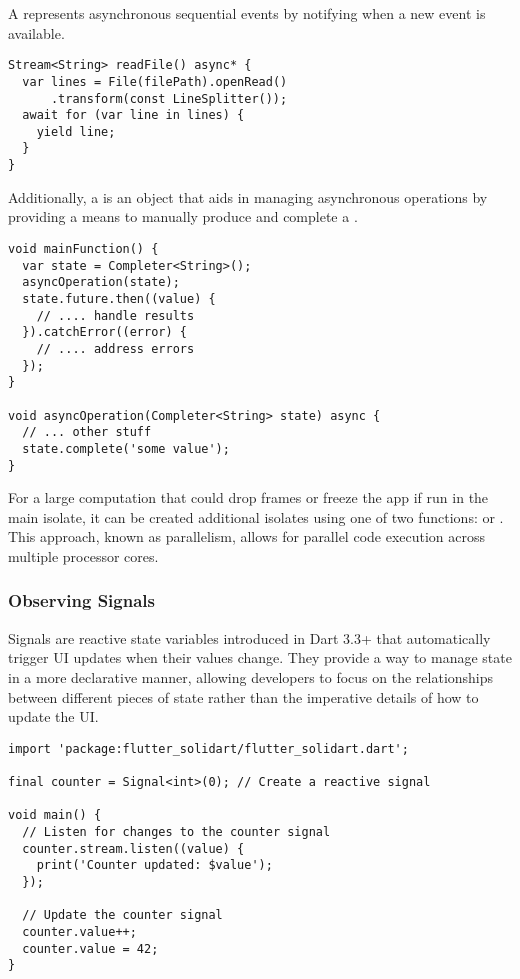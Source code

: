 \noindent A  represents asynchronous sequential events by notifying when a new event is available.

\begin{lstlisting}
Stream<String> readFile() async* {
  var lines = File(filePath).openRead()
      .transform(const LineSplitter());
  await for (var line in lines) {
    yield line;
  }
}
\end{lstlisting}

\noindent Additionally, a  is an object that aids in managing asynchronous operations by providing a means
to manually produce and complete a .

\begin{lstlisting}
void mainFunction() {
  var state = Completer<String>();
  asyncOperation(state);
  state.future.then((value) {
    // .... handle results
  }).catchError((error) {
    // .... address errors
  });
}

void asyncOperation(Completer<String> state) async {
  // ... other stuff
  state.complete('some value');
}
\end{lstlisting}

\noindent For a large computation that could drop frames or freeze the app if run in the main isolate, it can be
created additional isolates using one of two functions:  or . This approach, known as
parallelism, allows for parallel code execution across multiple processor cores.


\subsubsection{Observing Signals}

Signals are reactive state variables introduced in Dart 3.3+ that automatically trigger UI updates when their values
change. They provide a way to manage state in a more declarative manner, allowing developers to focus on the
relationships between different pieces of state rather than the imperative details of how to update the UI.

\begin{lstlisting}
import 'package:flutter_solidart/flutter_solidart.dart';

final counter = Signal<int>(0); // Create a reactive signal

void main() {
  // Listen for changes to the counter signal
  counter.stream.listen((value) {
    print('Counter updated: $value');
  });

  // Update the counter signal
  counter.value++;
  counter.value = 42;
}
\end{lstlisting}

